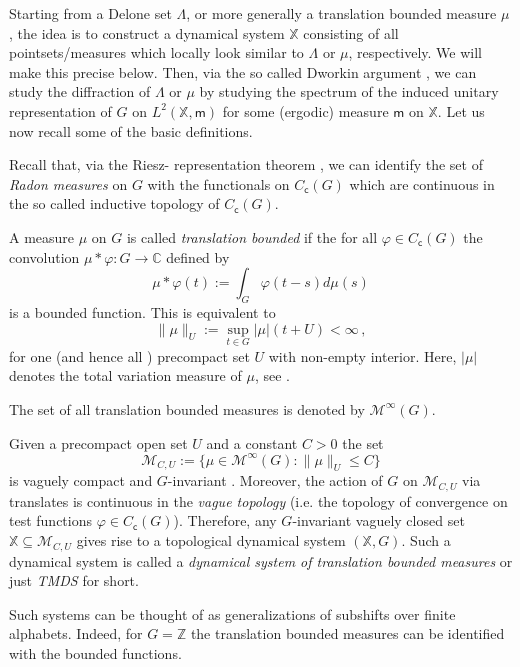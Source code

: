 \documentclass [14pt]{amsart}
\numberwithin{equation}{section}
\newcommand{\ZZ}{{\mathbb Z}}
\newcommand{\CC}{{\mathbb C}}
\newcommand{\XX}{\mathbb X}
\newcommand{\cM}{{\mathcal M}}
\newcommand{\mm}{\mathsf{m}}
\newcommand{\Cc}{C_{\mathsf{c}}}
\begin{document}
\smallskip

Starting from a Delone set $\Lambda$, or more generally a translation bounded measure $\mu$, the idea is to construct a dynamical system $\XX$ consisting of all pointsets/measures which locally look similar to $\Lambda$ or $\mu$, respectively. We will make this precise below. Then, via the so called Dworkin argument \cite{Dwo}, we can study the diffraction of $\Lambda$ or $\mu$ by studying the spectrum of the induced unitary representation of $G$ on $L^2(\XX, \mm)$ for some (ergodic) measure $\mm$ on $\XX$.
Let us now recall some of the basic definitions.


\smallskip

Recall that, via the Riesz- representation theorem \cite{Rud}, we can identify the set of \textit{Radon measures} on $G$ with the functionals on $\Cc(G)$ which are continuous in the so called inductive topology of $\Cc(G)$.

A  measure $\mu$  on $G$  is called \textit{translation bounded}  if the for all $\varphi \in \Cc(G)$ the convolution $\mu \ast \varphi : G\longrightarrow  \CC$ defined by
$$\mu \ast \varphi (t) :=\int_G \varphi (t-s) d\mu (s)$$
is a bounded function.  This is equivalent \cite{ARMA1} to
\[
\| \mu \|_{U} := \sup_{t \in G} \left| \mu \right|(t+U)  < \infty\,,
\]
for one (and hence all \cite{BM}) precompact set $U$ with non-empty interior. Here, $\left| \mu \right|$ denotes the total variation measure of $\mu$, see \cite[Theorem 6.5.6]{Ped}.

The set of all translation bounded measures is denoted by $\cM^\infty (G)$.

\smallskip


Given a precompact open set $U$ and a constant $C>0$ the set
\[
\cM_{C,U}:=\{ \mu \in \cM^\infty(G): \| \mu \|_{U} \leq C \}
\]
is vaguely compact and $G$-invariant \cite{BL}. Moreover, the action of $G$ on $\cM_{C,U}$ via translates is continuous in the \textit{vague topology} (i.e. the topology of convergence on test functions $\varphi \in \Cc(G)$). Therefore, any $G$-invariant vaguely closed set $\XX \subseteq \cM_{C,U}$ gives rise to a topological dynamical system $(\XX,G)$. Such a dynamical system is called a \textit{dynamical system of translation bounded measures} or just \textit{TMDS} for short.

Such systems can be thought of as generalizations of subshifts over finite alphabets. Indeed, for $G =\ZZ$ the translation bounded measures can be identified with the bounded functions.
\end{document}
